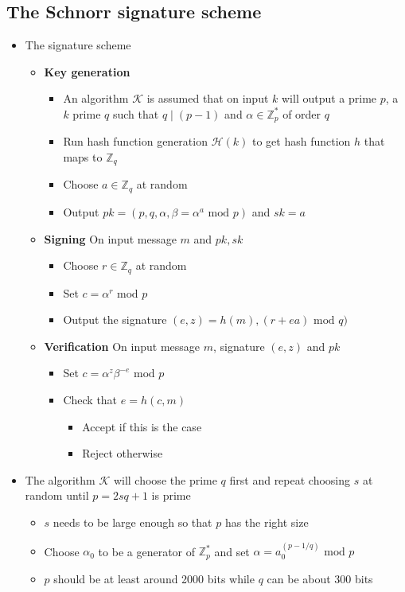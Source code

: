 \subsection{The Schnorr signature scheme}
\begin{itemize}
  \item The signature scheme
  \begin{itemize}
  	\item \textbf{Key generation}
    \begin{itemize}
  		\item An algorithm $\mathcal K$ is assumed that on input $k$ will output a prime $p$, a $k$ prime $q$ such that $q \mid (p-1)$ and $\alpha \in \mathbb Z_p^*$ of order $q$
  		\item Run hash function generation $\mathcal H(k)$ to get hash function $h$ that maps to $\mathbb Z_q$
  		\item Choose $a \in \mathbb Z_q$ at random
  		\item Output $pk = (p,q, \alpha, \beta = \alpha^a \text{ mod } p)$ and $sk = a$
    \end{itemize}
  	\item \textbf{Signing} On input message $m$ and $pk,sk$
    \begin{itemize}
  		\item Choose $r \in \mathbb Z_q$ at random
  		\item Set $c = \alpha^r \text{ mod } p$
  		\item Output the signature $(e,z) = h(m), (r + ea) \text{ mod } q)$
    \end{itemize}
  	\item \textbf{Verification} On input message $m$, signature $(e,z)$ and $pk$
    \begin{itemize}
  		\item Set $c = \alpha^z \beta^{-e} \text{ mod } p$
  		\item Check that $e = h(c,m)$
      \begin{itemize}
  			\item Accept if this is the case
  			\item Reject otherwise
      \end{itemize}
    \end{itemize}
  \end{itemize}

  \item The algorithm $\mathcal K$ will choose the prime $q$ first and repeat choosing $s$ at random until $p = 2sq + 1$ is prime
  \begin{itemize}
  	\item $s$ needs to be large enough so that $p$ has the right size
  	\item Choose $\alpha_0$ to be a generator of $\mathbb Z_p^*$ and set $\alpha = a_0^{(p-1/q)} \text{ mod } p$
  	\item $p$ should be at least around 2000 bits while $q$ can be about 300 bits
  \end{itemize}


\end{itemize}
